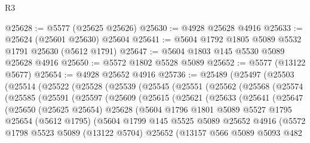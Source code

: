 \begin{lexlean}{R3}
\begin{coremodule}
@25628 := @5577 (@25625 @25626)
@25630 := @4928 @25628 @4916
@25633 := @25624 (@25601 @25630) @25604
@25641 := @5604 @1792 @1805 @5089 @5532 @1791 @25630 (@5612 @1791)
@25647 := @5604 @1803 @145 @5530 @5089 @25628 @4916
@25650 := @5572 @1802 @5528 @5089
@25652 := @5577 (@13122 @5677)
@25654 := @4928 @25652 @4916
@25736 := @25489
    (@25497
      (@25503
        (@25514
          (@25522
            (@25528
              (@25539
                (@25545
                  (@25551
                    (@25562
                      (@25568
                        (@25574
                          (@25585
                            (@25591
                              (@25597
                                (@25609
                                  (@25615
                                    (@25621
                                      (@25633
                                        (@25641
                                          (@25647
                                            (@25650
                                              (@25625 @25654)
                                              @25628
                                              (@5604
                                                @1796
                                                @1801
                                                @5089
                                                @5527
                                                @1795
                                                @25654
                                                (@5612 @1795)
                                                (@5604
                                                  @1799
                                                  @145
                                                  @5525
                                                  @5089
                                                  @25652
                                                  @4916
                                                  (@5572
                                                    @1798
                                                    @5523
                                                    @5089
                                                    (@13122 @5704)
                                                    @25652
                                                    (@13157
                                                      @566
                                                      @5089
                                                      @5093
                                                      @482

\end{coremodule}
\end{lexlean}
